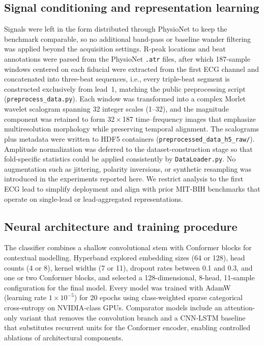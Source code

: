 \subsection{Signal conditioning and representation learning}
Signals were left in the form distributed through PhysioNet to keep the benchmark comparable, so no additional band-pass or baseline wander filtering was applied beyond the acquisition settings. R-peak locations and beat annotations were parsed from the PhysioNet \texttt{.atr} files, after which 187-sample windows centered on each fiducial were extracted from the first ECG channel and concatenated into three-beat sequences, i.e., every triple-beat segment is constructed exclusively from lead~1, matching the public preprocessing script (\texttt{preprocess\_data.py}). Each window was transformed into a complex Morlet wavelet scalogram spanning 32 integer scales (1--32), and the magnitude component was retained to form 32\,$\times$\,187 time--frequency images that emphasize multiresolution morphology while preserving temporal alignment.\cite{addison2005wavelet,torrence1998practical,mallat1989wavelet} The scalograms plus metadata were written to HDF5 containers (\texttt{preprocessed\_data\_h5\_raw/}). Amplitude normalization was deferred to the dataset-construction stage so that fold-specific statistics could be applied consistently by \texttt{DataLoader.py}. No augmentation such as jittering, polarity inversions, or synthetic resampling was introduced in the experiments reported here. We restrict analysis to the first ECG lead to simplify deployment and align with prior MIT-BIH benchmarks that operate on single-lead or lead-aggregated representations.\cite{kiranyaz2015personalized,luz2016ecg}

\subsection{Neural architecture and training procedure}
The classifier combines a shallow convolutional stem with Conformer blocks for contextual modelling.\cite{gulati2020conformer} Hyperband explored embedding sizes (64 or 128), head counts (4 or 8), kernel widths (7 or 11), dropout rates between 0.1 and 0.3, and one or two Conformer blocks, and selected a 128-dimensional, 8-head, 11-sample configuration for the final model. Every model was trained with AdamW (learning rate $1\times10^{-5}$) for 20 epochs using class-weighted sparse categorical cross-entropy on NVIDIA-class GPUs. Comparator models include an attention-only variant that removes the convolution branch and a CNN-LSTM baseline that substitutes recurrent units for the Conformer encoder, enabling controlled ablations of architectural components.

